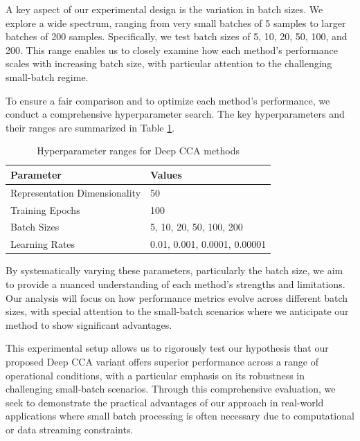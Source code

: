A key aspect of our experimental design is the variation in batch sizes. We explore a wide spectrum, ranging from very small batches of 5 samples to larger batches of 200 samples. Specifically, we test batch sizes of 5, 10, 20, 50, 100, and 200. This range enables us to closely examine how each method's performance scales with increasing batch size, with particular attention to the challenging small-batch regime.

To ensure a fair comparison and to optimize each method's performance, we conduct a comprehensive hyperparameter search. The key hyperparameters and their ranges are summarized in Table \ref{tab:hyperparameters}.

\begin{table}[h!]
    \centering
    \caption{Hyperparameter ranges for Deep CCA methods}
    \label{tab:hyperparameters}
    \begin{tabular}{|l|l|}
        \hline
        Parameter                   & Values                    \\
        \hline
        Representation Dimensionality & 50                        \\
        Training Epochs             & 100                       \\
        Batch Sizes                 & 5, 10, 20, 50, 100, 200   \\
        Learning Rates              & 0.01, 0.001, 0.0001, 0.00001 \\
        \hline
    \end{tabular}
\end{table}

By systematically varying these parameters, particularly the batch size, we aim to provide a nuanced understanding of each method's strengths and limitations. Our analysis will focus on how performance metrics evolve across different batch sizes, with special attention to the small-batch scenarios where we anticipate our method to show significant advantages.

This experimental setup allows us to rigorously test our hypothesis that our proposed Deep CCA variant offers superior performance across a range of operational conditions, with a particular emphasis on its robustness in challenging small-batch scenarios. Through this comprehensive evaluation, we seek to demonstrate the practical advantages of our approach in real-world applications where small batch processing is often necessary due to computational or data streaming constraints.

